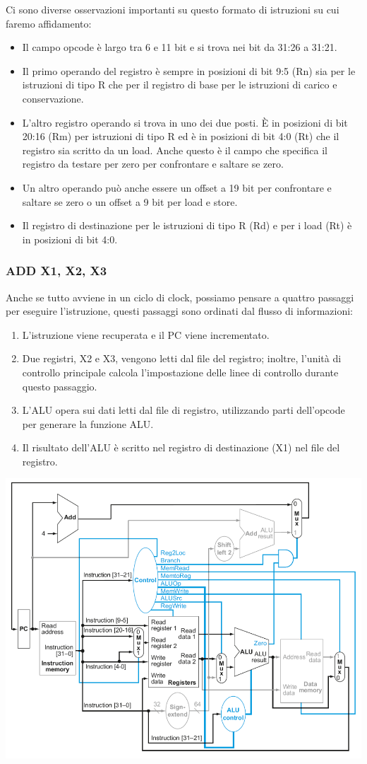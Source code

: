 \documentclass[12pt,a4paper]{article}
\begin{document}
Ci sono diverse osservazioni importanti su questo formato di istruzioni su cui faremo affidamento:
\begin{itemize}
\item Il campo opcode è largo tra 6 e 11 bit e si trova nei bit da 31:26 a 31:21.
\item Il primo operando del registro è sempre in posizioni di bit 9:5 (Rn) sia per le istruzioni di tipo R che per il registro di base per le istruzioni di carico e conservazione.
\item L'altro registro operando si trova in uno dei due posti. È in posizioni di bit 20:16 (Rm) per istruzioni di tipo R ed è in posizioni di bit 4:0 (Rt) che il registro sia scritto da un load. Anche questo è il campo che specifica il registro da testare per zero per confrontare e saltare se zero.
\item Un altro operando può anche essere un offset a 19 bit per confrontare e saltare se zero o un offset a 9 bit per load e store.
\item Il registro di destinazione per le istruzioni di tipo R (Rd) e per i load (Rt) è in posizioni di bit 4:0.
\end{itemize}

\subsubsection{ADD X1, X2, X3}
Anche se tutto avviene in un ciclo di clock, possiamo pensare a quattro passaggi per eseguire l'istruzione, questi passaggi sono ordinati dal flusso di informazioni:
\begin{enumerate}
\item L'istruzione viene recuperata e il PC viene incrementato.
\item Due registri, X2 e X3, vengono letti dal file del registro; inoltre, l'unità di controllo principale calcola l'impostazione delle linee di controllo durante questo passaggio.
\item L'ALU opera sui dati letti dal file di registro, utilizzando parti dell'opcode per generare la funzione ALU.
\item Il risultato dell'ALU è scritto nel registro di destinazione (X1) nel file del registro.
\end{enumerate}
\begin{center}
\includegraphics[width=0.6\columnwidth]{img/add_x1x2x3.png}
\end{center}
\end{document}
